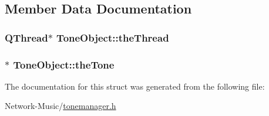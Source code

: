 \subsection{Member Data Documentation}
\hypertarget{struct_tone_object_abeb12728a40883a44c0440db7dbb1732}{
\subsubsection[{the\-Thread}]{\setlength{\rightskip}{0pt plus 5cm}Q\-Thread$\ast$ Tone\-Object\-::the\-Thread}}\label{struct_tone_object_abeb12728a40883a44c0440db7dbb1732}
\hypertarget{struct_tone_object_a47610a83de0887b5c8e5d8e009312958}{
\subsubsection[{the\-Tone}]{$\ast$ Tone\-Object\-::the\-Tone}}\label{struct_tone_object_a47610a83de0887b5c8e5d8e009312958}


The documentation for this struct was generated from the following file\-:\begin{DoxyCompactItemize}
\item 
Network-\/\-Music/\hyperlink{tonemanager_8h}{tonemanager.\-h}\end{DoxyCompactItemize}
